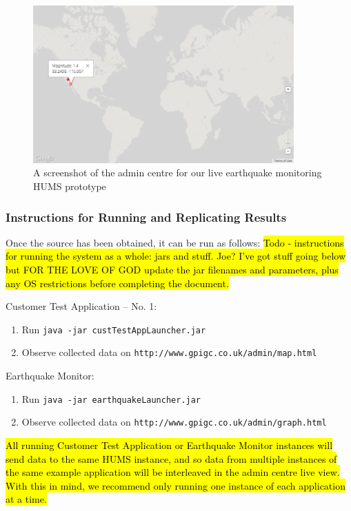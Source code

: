 \documentclass[10pt,a4paper]{article}
\begin{document}
\begin{figure}[htbp!]
  \centering
  \includegraphics[width=10cm]{images/plotearthquakes.png}
  \caption{A screenshot of the admin centre for our live earthquake monitoring HUMS prototype}
  \label{fig:plotearthquakes}
\end{figure}

\subsubsection{Instructions for Running and Replicating Results}
Once the source has been obtained, it can be run as follows: \hl{Todo - instructions for running the system as a whole: jars and stuff. Joe? I've got stuff going below but FOR THE LOVE OF GOD update the jar filenames and parameters, plus any OS restrictions before completing the document.}

Customer Test Application -- No. 1:
\begin{enumerate}
  \item Run \verb+java -jar custTestAppLauncher.jar+
  \item Observe collected data on \verb+http://www.gpigc.co.uk/admin/map.html+
\end{enumerate}

Earthquake Monitor:
\begin{enumerate}
  \item Run \verb+java -jar earthquakeLauncher.jar+
  \item Observe collected data on \verb+http://www.gpigc.co.uk/admin/graph.html+
\end{enumerate}

\hl{All running Customer Test Application or Earthquake Monitor instances will send data to the same HUMS instance, and so data from multiple instances of the same example application will be interleaved in the admin centre live view. With this in mind, we recommend only running one instance of each application at a time.} %
\end{document}
